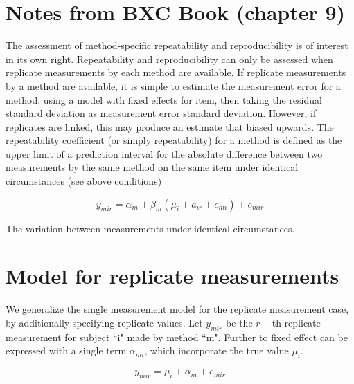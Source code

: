 \documentclass[12pt, a4paper]{report}
\theoremstyle{plain}
\theoremstyle{definition}
\theoremstyle{remark}
\begin{document}
	
	
	
	
	
	
	
	
	
	\newpage
	
	
	\section{Notes from BXC Book (chapter 9)}
	The assessment of method-specific repeatability and reproducibility is of interest in its own right.
	Repeatability and reproducibility can only be assessed when replicate measurements by each method are available.
	If replicate measurements by a method are available, it is simple to estimate the measurement error for a method, using a model with fixed effects for item, then taking the residual standard deviation as measurement error standard deviation.
	However, if replicates are linked, this may produce an estimate that biased upwards.
	The repeatability coefficient (or simply repeatability) for a method is defined as the upper limit of a
	prediction interval for the absolute difference between two measurements by the same method on the same
	item under identical circumstances (see above conditions)
	
	\[y_{mir}  = \alpha_{m} + \beta_m( \mu_i + a_{ir} + c_{mi}) + e_{mir}\]
	
	The variation between measurements under identical circumstances.
	

	
	

	\section{Model for replicate measurements}
	
	We generalize the single measurement model for the replicate measurement case, by additionally specifying replicate values. Let $y_{mir}$ be the $r-$th replicate measurement for subject ``i" made by method ``m". Further to \citet{barnhart} fixed effect can be expressed with a single term $\alpha_{mi}$, which incorporate the true value $\mu_i$.
	
	\[ y_{mir} = \mu_{i} + \alpha_{m} + e_{mir}  \]
	
\end{document}
